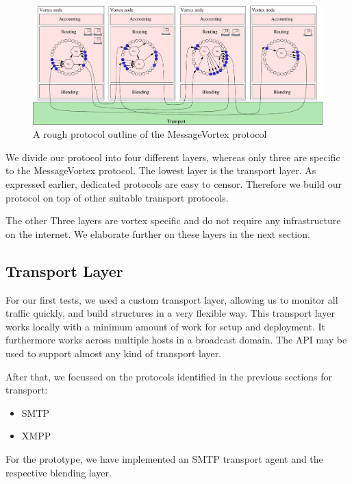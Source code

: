 \begin{figure}[ht!]
	\centering\includegraphics[width=\columnwidth]{inc/roughProtocolDesign.pdf}
	\caption{A rough protocol outline of the MessageVortex protocol}\label{fig:protocolOutline}
\end{figure}

We divide our protocol into four different layers, whereas only three are specific to the MessageVortex protocol. The lowest layer is the transport layer. As expressed earlier, dedicated protocols are easy to censor. Therefore we build our protocol on top of other suitable transport protocols. 

The other Three layers are vortex specific and do not require any infrastructure on the internet. We elaborate further on these layers in the next section.

\subsection{Transport Layer}
For our first tests, we used a custom transport layer, allowing us to monitor all traffic quickly, and build structures in a very flexible way. This transport layer works locally with a minimum amount of work for setup and deployment. It furthermore works across multiple hosts in a broadcast domain. The API may be used to support almost any kind of transport layer.

After that, we focussed on the protocols identified in the previous sections for transport:
\begin{itemize}
	\item SMTP
	\item XMPP
\end{itemize}
For the prototype, we have implemented an SMTP transport agent and the respective blending layer.

